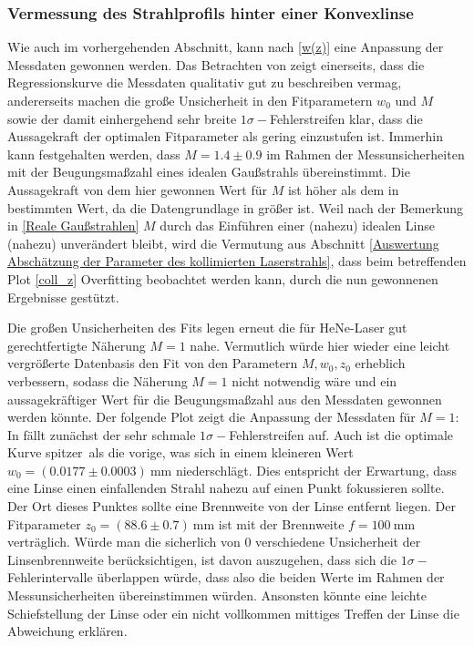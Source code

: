\documentclass[11pt,a4paper,oneside]{scrartcl}
\begin{document}
\subsubsection{Vermessung des Strahlprofils hinter einer Konvexlinse}\label{Auswertung Vermessung des Strahlprofils hinter einer Konvexlinse}
Wie auch im vorhergehenden Abschnitt, kann nach \ref{w(z)} eine Anpassung der Messdaten gewonnen werden. 
Das Betrachten von  zeigt einerseits, dass die Regressionskurve die Messdaten qualitativ gut zu beschreiben vermag, andererseits machen die große Unsicherheit in den Fitparametern $w_0$ und $M$ sowie der damit einhergehend sehr breite $1\sigma-$Fehlerstreifen klar, dass die Aussagekraft der optimalen Fitparameter als gering einzustufen ist. Immerhin kann festgehalten werden, dass $M=1.4\pm0.9$ im Rahmen der Messunsicherheiten mit der Beugungsmaßzahl eines idealen Gaußstrahls übereinstimmt. Die Aussagekraft von dem hier gewonnen Wert für $M$ ist höher als dem in  bestimmten Wert, da die Datengrundlage in  größer ist. Weil nach der Bemerkung in \ref{Reale Gaußstrahlen} $M$ durch das Einführen einer (nahezu) idealen Linse (nahezu) unverändert bleibt, wird die Vermutung aus Abschnitt \ref{Auswertung Abschätzung der Parameter des kollimierten Laserstrahls}, dass beim betreffenden Plot \ref{coll_z} Overfitting beobachtet werden kann, durch die nun gewonnenen Ergebnisse gestützt.\par
Die großen Unsicherheiten des Fits legen erneut die für HeNe-Laser gut gerechtfertigte Näherung $M=1$ nahe. Vermutlich würde hier wieder eine leicht vergrößerte Datenbasis den Fit von den Parametern $M,w_0,z_0$ erheblich verbessern, sodass die Näherung $M=1$ nicht notwendig wäre und ein aussagekräftiger Wert für die Beugungsmaßzahl aus den Messdaten gewonnen werden könnte. Der folgende Plot zeigt die Anpassung der Messdaten für $M=1$:
In  fällt zunächst der sehr schmale $1\sigma-$Fehlerstreifen auf. Auch ist die optimale Kurve \glqq spitzer\grqq\ als die vorige, was sich in einem kleineren Wert $w_0=(0.0177\pm0.0003)\ \mathrm{mm}$ niederschlägt. Dies entspricht der Erwartung, dass eine Linse einen einfallenden Strahl nahezu auf einen Punkt fokussieren sollte. Der Ort dieses Punktes sollte eine Brennweite von der Linse entfernt liegen. Der Fitparameter $z_0=(88.6\pm0.7)\ \mathrm{mm}$ ist mit der Brennweite $f=100\ \mathrm{mm}$ verträglich. Würde man die sicherlich von $0$ verschiedene Unsicherheit der Linsenbrennweite berücksichtigen, ist davon auszugehen, dass sich die $1\sigma-$Fehlerintervalle überlappen würde, dass also die beiden Werte im Rahmen der Messunsicherheiten übereinstimmen würden. Ansonsten könnte eine leichte Schiefstellung der Linse oder ein nicht vollkommen mittiges Treffen der Linse die Abweichung erklären. \\
\end{document}
